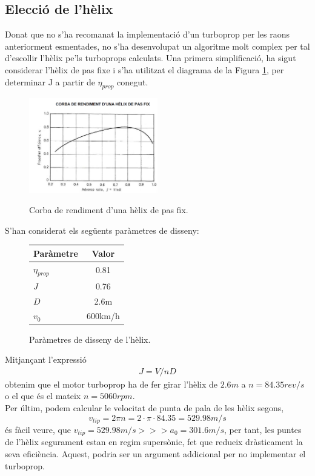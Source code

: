 \subsection{Elecció de l'hèlix}
Donat que no s'ha recomanat la implementació d'un turboprop per les raons anteriorment esmentades, no s'ha desenvolupat un algoritme molt complex per tal d'escollir l'hèlix pe'ls turboprops calculats. Una primera simplificació, ha sigut considerar l'hèlix de pas fixe i s'ha utilitzat el diagrama de la Figura \ref{diag_helix}, per determinar J a partir de $\eta_{prop}$ conegut.

\begin{figure}[H]
	\centering
	\includegraphics[width = 0.5\textwidth]{./pics/diag_helix}
	\label{diag_helix}
	\caption{Corba de rendiment d'una hèlix de pas fix.}
\end{figure}

\noindent S'han considerat els següents paràmetres de disseny:
\begin{figure}[H]
	\centering
	\begin{tabular}{lc}
		\toprule[3pt]
		\textbf{Paràmetre}&\textbf{Valor}\\
		\midrule[1pt]
		$\eta_{prop}$ & 0.81\\
		$J$ & 0.76\\
		$D$ & 2.6m\\
		$v_0$&600km/h\\
				
		\bottomrule[2pt]
	\end{tabular}
	\label{helix_param}
	\caption{Paràmetres de disseny de l'hèlix.}
\end{figure}
Mitjançant l'expressió 
\begin{align}
	J = V/nD
\end{align}
obtenim que el motor turboprop ha de fer girar l'hèlix de $2.6m$ a \textbf{$n=84.35 rev/s$} o el que és el mateix \textbf{$n=5060rpm$}.\\

\noindent Per últim, podem calcular le velocitat de punta de pala de les hèlix segons,
\begin{equation}
	v_{tip}=2\pi n = 2\cdot\pi\cdot84.35=529.98m/s
\end{equation}
és fàcil veure, que $v_{tip}=529.98m/s >>> a_0 =  301.6m/s$, per tant, les puntes de l'hèlix segurament estan en regim supersònic, fet que redueix dràsticament la seva eficiència. Aquest, podria ser un argument addicional per no implementar el turboprop.  


\clearpage